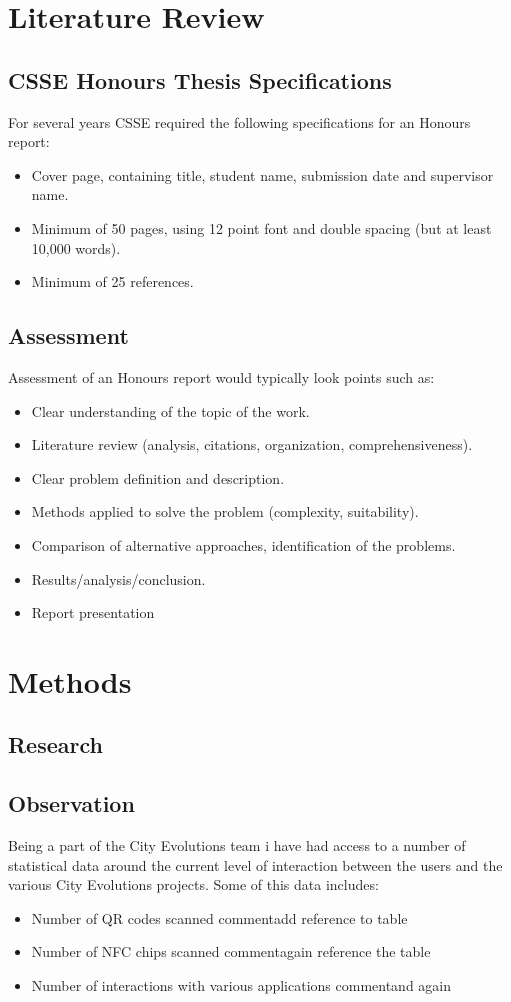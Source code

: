 \documentclass[a4,12pt]{article}
\begin{document}
%
\section{Literature Review}

\subsection{CSSE Honours Thesis Specifications}\label{sec:thesis}
For several years CSSE required the following specifications for an Honours report:
\begin{itemize}
\item Cover page, containing title, student name, submission date and supervisor name.
\item Minimum of 50 pages, using 12 point font and double spacing (but at least 10,000 words).
\item Minimum of 25 references.
\end{itemize}

\subsection{Assessment} \label{sec:assessment}
Assessment of an Honours report would typically look points such as:
\begin{itemize}
\item Clear understanding of the topic of the work.
\item Literature review (analysis, citations, organization, comprehensiveness).
\item Clear problem definition and description.
\item Methods applied to solve the problem (complexity, suitability).
\item Comparison of alternative approaches, identification of the problems.
\item Results/analysis/conclusion.
\item Report presentation
\end{itemize}
%
\section{Methods}
\subsection{Research}
\subsection{Observation}
Being a part of the City Evolutions team i have had access to a number of statistical data around the current level of interaction between the users and the various City Evolutions projects. Some of this data includes:
\begin{itemize}
    \item{Number of QR codes scanned comment{add reference to table}}
    \item{Number of NFC chips scanned comment{again reference the table}}
    \item{Number of interactions with various applications comment{and again}}
\end{itemize}
\end{document}
